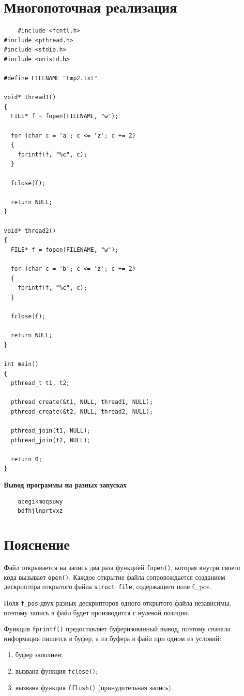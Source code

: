 \section{Многопоточная реализация}

\begin{lstlisting}
	#include <fcntl.h>
#include <pthread.h>
#include <stdio.h>
#include <unistd.h>

#define FILENAME "tmp2.txt"

void* thread1()
{
  FILE* f = fopen(FILENAME, "w");

  for (char c = 'a'; c <= 'z'; c += 2)
  {
    fprintf(f, "%c", c);
  }

  fclose(f);

  return NULL;
}

void* thread2() 
{
  FILE* f = fopen(FILENAME, "w");

  for (char c = 'b'; c <= 'z'; c += 2)
  { 
    fprintf(f, "%c", c);
  }

  fclose(f);

  return NULL;
}

int main()
{
  pthread_t t1, t2;

  pthread_create(&t1, NULL, thread1, NULL);
  pthread_create(&t2, NULL, thread2, NULL);

  pthread_join(t1, NULL);
  pthread_join(t2, NULL);

  return 0;
}
\end{lstlisting}

\textbf{Вывод программы на разных запусках}

\begin{lstlisting}
	acegikmoqsuwy
	bdfhjlnprtvxz
\end{lstlisting}

\section{Пояснение}

 Файл открывается на запись два раза функцией \texttt{fopen()}, которая внутри своего кода вызывает \texttt{open()}. Каждое открытие файла сопровождается созданием дескриптора открытого файла \texttt{struct file}, содержащего поле f\_pos.
 
  Поля \texttt{f\_pos} двух разных дескрипторов одного открытого файла независимы, поэтому запись в файл будет производится с нулевой позиции.

Функция \texttt{fprintf()} предоставляет буферизованный вывод, поэтому сначала информация пишется в буфер, а из буфера в файл при одном из условий:
\begin{enumerate}
	\item буфер заполнен;
	\item вызвана функция \texttt{fclose()};
	\item вызвана функция \texttt{fflush()} (принудительная запись).
\end{enumerate}

